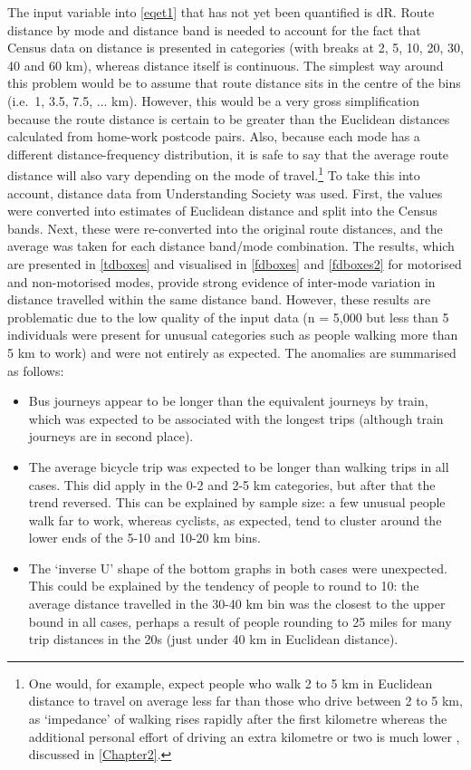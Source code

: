 \documentclass[a4paper, 11pt, twoside]{Thesis}
\begin{document}
The input variable into \cref{eqet1} that has not yet been quantified is
dR. Route distance by mode and distance band
is needed to account for the fact that Census data on distance is presented in
categories (with breaks at 2, 5, 10, 20, 30, 40 and 60 km), whereas distance
itself is continuous. The simplest way around this problem would be to
assume that route distance sits in the centre of the bins (i.e.~1, 3.5, 7.5, ...
km). However, this would be a very gross simplification because the route distance
is certain to be greater than the Euclidean distances calculated from
home-work postcode pairs. Also, because each mode has a different
distance-frequency distribution,
it is safe to say that the average route distance will also vary depending
on the mode of travel.\footnote{One would, for example,
expect people who walk 2 to 5
km in Euclidean distance to travel on average less far than those who drive
between 2 to 5 km, as `impedance' of walking rises rapidly after the first
kilometre whereas the additional personal effort of driving
an extra kilometre or two is much lower
\citep{Iacono2010}, discussed in \cref{Chapter2}.
}
To take this into account, distance data from Understanding Society was used.
First, the values were converted into estimates of Euclidean distance and
split into the Census bands. Next, these were re-converted into the original
route distances, and the average was taken for each distance band/mode
combination. The results, which are presented in \cref{tdboxes} and visualised in 
\cref{fdboxes} and \cref{fdboxes2} for motorised and non-motorised modes,
provide strong evidence of inter-mode variation in distance travelled within
the same distance band. However, these results are problematic due to the
low quality of the input data (n = 5,000 but less than 5 individuals
were present for unusual
categories such as people walking more than 5 km to work) and were not entirely
as expected. The anomalies are summarised as follows:
\begin{itemize}
 \item Bus journeys appear to be longer than the equivalent journeys by train,
 which was expected to be associated with the longest trips (although train
 journeys are in second place).
 \item The average bicycle trip was expected to be longer than walking trips
 in all cases. This did apply in the 0-2 and 2-5 km categories, but after that
 the trend reversed. This can be explained by sample size: a few unusual people
 walk far to work, whereas cyclists, as expected, tend to cluster around the lower
 ends of the 5-10 and 10-20 km bins.
 \item The `inverse U' shape of the bottom graphs in both cases were unexpected.
 This could be explained by the tendency of people to round to 10: the
 average distance travelled in the 30-40 km bin was the closest to the upper
 bound in all cases, perhaps a result of people rounding to 25 miles for many
 trip distances in the 20s (just under 40 km in Euclidean distance).
\end{itemize}
\end{document}
